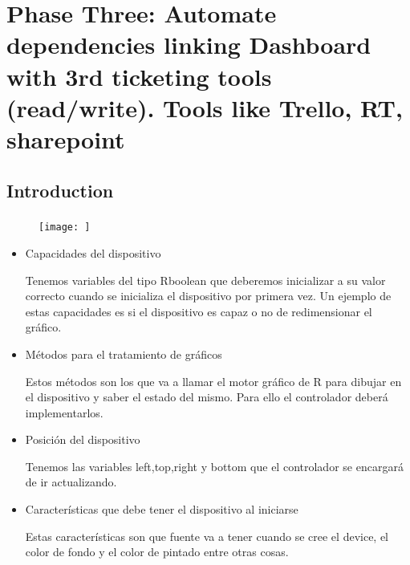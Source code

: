 \part{Phase Three: Automate dependencies linking Dashboard with 3rd ticketing
tools (read/write). Tools like Trello, RT, sharepoint}
\chapter{Introduction}
\label{c_phasethree}

\section{}

\subsection{}

\subsubsection{}

\begin{figure}[ht!]
	\centering
   	\texttt{[image: ]}
   	\caption{}
   	\label{f_}
\end{figure}

\begin{itemize}
  
  \item Capacidades del dispositivo
  
  Tenemos variables del tipo \textsf{Rboolean} que deberemos inicializar a su valor
  correcto cuando se inicializa el dispositivo por primera vez. Un ejemplo de
  estas capacidades es si el dispositivo es capaz o no de redimensionar el
  gráfico.
  
  \item Métodos para el tratamiento de gráficos
  
  Estos métodos son los que va a llamar el motor gráfico de R para dibujar en el
  dispositivo y saber el estado del mismo. Para ello el controlador deberá
  implementarlos.
  
  \item Posición del dispositivo
  
  Tenemos las variables left,top,right y bottom que el controlador se encargará
  de ir actualizando.
  
  \item Características que debe tener el dispositivo al iniciarse
  
  Estas características son que fuente va a tener cuando se cree el device, el
  color de fondo y el color de pintado entre otras cosas.
  
\end{itemize}